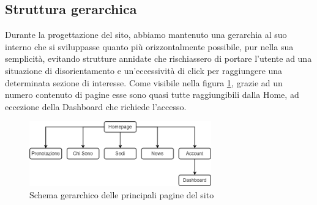\documentclass{article}
\begin{document}
\subsection{Struttura gerarchica} \label{gerarchia}
Durante la progettazione del sito, abbiamo mantenuto una gerarchia al suo interno che si sviluppasse quanto più orizzontalmente possibile, pur nella sua semplicità, evitando strutture annidate che rischiassero di portare l'utente ad una situazione di disorientamento e un'eccessività di click per raggiungere una determinata sezione di interesse. Come visibile nella figura \ref{fig:gerarchia}, grazie ad un numero contenuto di pagine esse sono quasi tutte raggiungibili dalla Home, ad eccezione della Dashboard che richiede l'accesso.
\begin{figure} [h] 
    \centering
    \includegraphics[width=0.7\textwidth]{immagini/gerarchia.png}
    \caption{Schema gerarchico delle principali pagine del sito} \label{fig:gerarchia}
\end{figure}
\end{document}
